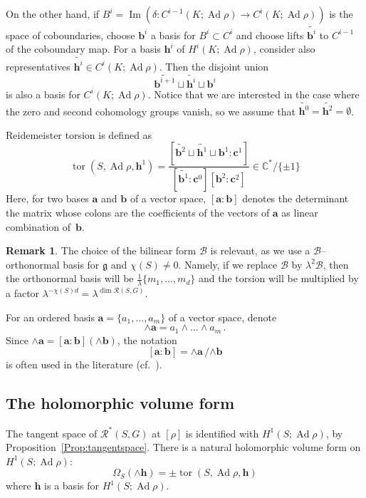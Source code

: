\documentclass[11pt]{article}
\theoremstyle{definition}
\newtheorem{rema}[theo]{Remark}
\numberwithin{equation}{section}
\numberwithin{figure}{section}
\numberwithin{table}{section}
\DeclareMathOperator{\tor}{tor}
\DeclareMathOperator{\Ad}{Ad}
\DeclareMathOperator{\Imop}{Im}
\newcommand{\Bcal}{\mathcal{B}}
\newcommand{\Rcal}{\mathcal{R}}
\newcommand{\Cbb}{\mathbb{C}}
\newcommand{\gfrk}{\mathfrak{g}}
\newcommand{\cbf}{\mathbf{c}}
\newcommand{\bbf}{\mathbf{b}}
\newcommand{\hbf}{\mathbf{h}}
\newcommand{\abf}{\mathbf{a}}
\newcommand*\dG{{d}}
\newcommand*\Rg{\Rcal^*}
\begin{document}
On the other hand, if $B^i=\Imop(\delta\colon C^{i-1}(K;\Ad\rho)\to C^i(K;\Ad\rho)) $ is the space of coboundaries, choose $\bbf^i$ a basis for $B^i\subset C^i$ and choose lifts $\widetilde{\bbf^i}$ to $C^{i-1}$ of the coboundary map. For a basis $\hbf^i$ of $H^i(K;\Ad\rho)$, consider also representatives $\widetilde{\hbf^i}\in C^i(K;\Ad\rho)$. Then the disjoint union
\[
\widetilde{\bbf^{i+1}}\sqcup \widetilde{\hbf^i} \sqcup {\bbf^i}
\]
is also a basis for $C^i(K;\Ad\rho)$. Notice that we are interested in the case where the zero and second cohomology groups vanish, so we assume that $\widetilde{\hbf^0}=\widetilde{\hbf^2}=\emptyset$.


Reidemeister torsion is defined as
\begin{equation}
\tor(S,\Ad\rho, \hbf^1)=
\frac{[\widetilde{\bbf^2}\sqcup \widetilde{\hbf^1} \sqcup {\bbf^1}: \cbf^1]}{[\widetilde{\bbf^1} : \cbf^0] [{\bbf^2} : \cbf^2]}
\in\Cbb^*/\{\pm 1\}
\end{equation}
Here, for two bases $\abf$ and $\bbf$ of a vector space, $[\abf:\bbf]$ denotes the determinant the matrix whose colons are the coefficients of the vectors of $\abf$ as linear combination of~$\bbf$.

\begin{rema}\label{rem:factorTorsion}
The choice of the bilinear form $\Bcal$ is relevant, as we use a $\Bcal$--orthonormal basis for $\gfrk$ and $\chi(S)\neq 0$. Namely, if we replace $\Bcal$ by $\lambda^2\Bcal$, then the orthonormal basis will be $\frac1\lambda\{m_1,\dots,m_{\dG}\}$ and the torsion will be multiplied by a factor $\lambda^{-\chi(S)\dG}= \lambda^{\dim \Rcal(S,G)} $.
\end{rema}



For an ordered basis $\abf=\{a_1,\dots, a_m\}$ of a vector space, denote
\[
\wedge\abf=a_1\wedge\dots \wedge a_m\,.
\]
Since $\wedge\abf= [\abf:\bbf] (\wedge\bbf)$, the notation
\[
[\abf:\bbf] = \wedge\abf \, \slash {\wedge\bbf}
\]
is often used in the literature (cf.~\cite{MilnorDuality}).


\subsection{The holomorphic volume form} The tangent space of $\Rg(S,G) $ at $[\rho]$ is identified with $H^1(S; \Ad\rho)$, by Proposition~\ref{Prop:tangentspace}. There is a natural holomorphic volume form on $H^1(S; \Ad\rho)$:
\[
\Omega_S(\wedge \hbf)=\pm \tor(S,\Ad\rho,\hbf)
\]
where $ \hbf $ is a basis for $H^1(S;\Ad\rho)$.
\end{document}
